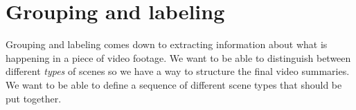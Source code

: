 %
%
%
\chapter{Grouping and labeling}
%
Grouping and labeling comes down to extracting information about what is happening in a piece of video footage. We want to be able to distinguish between different \textit{types} of scenes so we have a way to structure the final video summaries. We want to be able to define a sequence of different scene types that should be put together.
%
